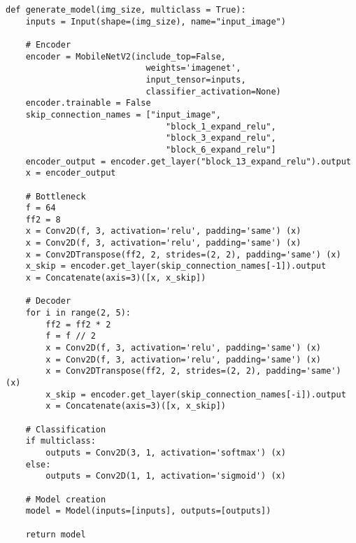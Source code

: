 \newpage
\begin{lstlisting}[caption={Final combined version of U-Net with the MobileNetV2},captionpos=b, label ={lst:FinalNet}]
def generate_model(img_size, multiclass = True):
    inputs = Input(shape=(img_size), name="input_image")
    
    # Encoder
    encoder = MobileNetV2(include_top=False,
                            weights='imagenet',
                            input_tensor=inputs,
                            classifier_activation=None)
    encoder.trainable = False
    skip_connection_names = ["input_image",
                                "block_1_expand_relu",
                                "block_3_expand_relu",
                                "block_6_expand_relu"]
    encoder_output = encoder.get_layer("block_13_expand_relu").output
    x = encoder_output

    # Bottleneck 
    f = 64
    ff2 = 8
    x = Conv2D(f, 3, activation='relu', padding='same') (x)
    x = Conv2D(f, 3, activation='relu', padding='same') (x)
    x = Conv2DTranspose(ff2, 2, strides=(2, 2), padding='same') (x)
    x_skip = encoder.get_layer(skip_connection_names[-1]).output
    x = Concatenate(axis=3)([x, x_skip])

    # Decoder
    for i in range(2, 5):
        ff2 = ff2 * 2
        f = f // 2 
        x = Conv2D(f, 3, activation='relu', padding='same') (x)
        x = Conv2D(f, 3, activation='relu', padding='same') (x)
        x = Conv2DTranspose(ff2, 2, strides=(2, 2), padding='same') (x)
        x_skip = encoder.get_layer(skip_connection_names[-i]).output
        x = Concatenate(axis=3)([x, x_skip])

    # Classification
    if multiclass:
        outputs = Conv2D(3, 1, activation='softmax') (x)
    else:
        outputs = Conv2D(1, 1, activation='sigmoid') (x)

    # Model creation 
    model = Model(inputs=[inputs], outputs=[outputs])

    return model
\end{lstlisting} 